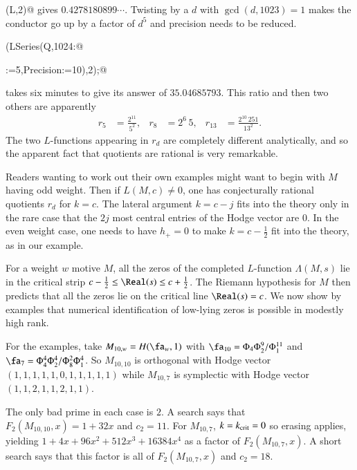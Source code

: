 \documentclass{notices}
\numberwithin{equation}{section}
\numberwithin{table}{section}
\numberwithin{figure}{section}
\begin{document}
{\verb@Evaluate(L,2)@ gives
$0.4278180899 \cdots$.
Twisting by a $d$ with $\gcd(d,1023)=1$ makes the conductor go up by a factor 
of $d^5$ and precision needs to be reduced.  
\smallskip

\verb@Evaluate(LSeries(Q,1024:@

\verb@QuadraticTwist:=5,Precision:=10),2);@
\smallskip

\noindent takes six minutes to give its answer of $35.04685793$.  This ratio
and then two others are apparently
\begin{align*}
r_5 & = \frac{2^{11}}{5^2}, & r_8 & = {2^6 \, 5}, & 
r_{13} &
=\frac{2^{10} \,251}{13^2} .
\end{align*}
The two $L$-functions appearing in $r_d$ are completely different
analytically, and so the apparent fact that quotients are rational
is very remarkable.  

Readers wanting to work out their own examples might want
to begin with $M$ having odd weight.  Then if $L(M,c) \neq 0$,
one has conjecturally rational quotients $r_d$ for $k=c$.
The lateral argument $k=c-j$ fits into the theory
only in the rare case that the $2j$ most central entries of the Hodge vector are $0$.    
In the even weight case, one needs to have $h_+=0$ to 
make $k=c-\frac{1}{2}$ fit into the theory,  as in our example.   







  For a 
weight $w$ 
motive $M$, all the zeros of the 
completed $L$-function $\Lambda(M,s)$ lie in the critical strip
$c- \frac{1}{2} \leq \Real(s) \leq c+\frac{1}{2}$. 
 The Riemann hypothesis
for $M$ then predicts that all the zeros lie on the critical line
$\Real(s) = c$.  We now show by examples that numerical identification of low-lying zeros is 
possible in modestly high rank.  

For the examples, take $M_{10,w} = H(\fa_w,1)$ with 
$\fa_{10} = {\Phi_4 \Phi_2^9}/{\Phi^{11}_1}$ and 
$\fa_7  = {\Phi_4^4 \Phi_2^4}/{\Phi_8^2 \Phi_1^4}$.
So $M_{10,10}$ is orthogonal with Hodge vector $(1,1,1,1,1,0,1,1,1,1,1)$
while $M_{10,7}$ is symplectic with Hodge vector $(1,1,2,1,1,2,1,1)$.





The only bad prime in each case is $2$.  A search says that $F_2(M_{10,10},x) = 1+32 x$ and
$c_2 = 11$. 
For $M_{10,7}$, $k=k_{\rm crit}=0$ so erasing
applies, yielding $1 + 4 x + 96 x^2 + 512 x^3 + 16384 x^4$
as a factor of $F_2(M_{10,7},x)$.  A short search says that this factor is all of 
$F_2(M_{10,7},x)$ and $c_2=18$.  

}
\end{document}
